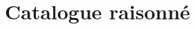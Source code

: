 \documentclass[11pt,twoside,openright]{book}
\begin{document}
\chapter{Catalogue raisonné}

\end{document}
